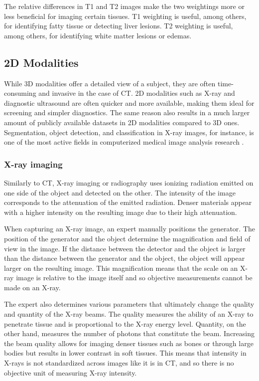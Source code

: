 The relative differences in T1 and T2 images make the two weightings more or less beneficial for imaging certain tissues. T1 weighting is useful, among others, for identifying fatty tissue or detecting liver lesions. T2 weighting is useful, among others, for identifying white matter lesions or edemas.

\subsection{2D Modalities}

While 3D modalities offer a detailed view of a subject, they are often time-consuming and invasive in the case of CT. 2D modalities such as X-ray and diagnostic ultrasound are often quicker and more available, making them ideal for screening and simpler diagnostics. The same reason also results in a much larger amount of publicly available datasets in 2D modalities compared to 3D ones. Segmentation, object detection, and classification in X-ray images, for instance, is one of the most active fields in computerized medical image analysis research \cite{nguyen2020vindrcxr, irvinCheXpertLargeChest2019}.

\subsubsection{X-ray imaging}

Similarly to CT, X-ray imaging or radiography uses ionizing radiation emitted on one side of the object and detected on the other. The intensity of the image corresponds to the attenuation of the emitted radiation. Denser materials appear with a higher intensity on the resulting image due to their high attenuation.

When capturing an X-ray image, an expert manually positions the generator. The position of the generator and the object determine the magnification and field of view in the image. If the distance between the detector and the object is larger than the distance between the generator and the object, the object will appear larger on the resulting image. This magnification means that the scale on an X-ray image is relative to the image itself and so objective measurements cannot be made on an X-ray.

The expert also determines various parameters that ultimately change the quality and quantity of the X-ray beams. The quality measures the ability of an X-ray to penetrate tissue and is proportional to the X-ray energy level. Quantity, on the other hand, measures the number of photons that constitute the beam. Increasing the beam quality allows for imaging denser tissues such as bones or through large bodies but results in lower contrast in soft tissues. This means that intensity in X-rays is not standardized across images like it is in CT, and so there is no objective unit of measuring X-ray intensity.

